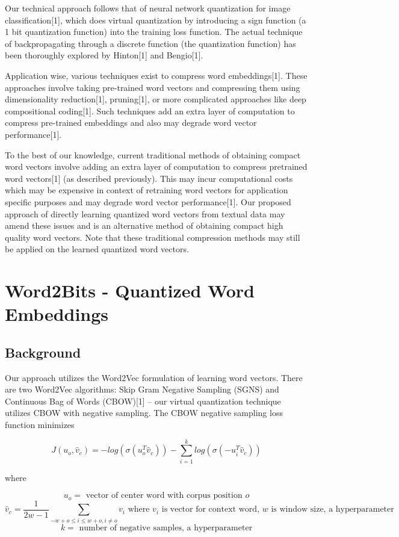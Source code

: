 \documentclass{article} %
\begin{document}
Our technical approach follows that of neural network quantization for
image classification[1], which does virtual quantization by
introducing a sign function (a 1 bit quantization function) into the
training loss function. The actual technique of backpropagating through a
discrete function (the quantization function) has been thoroughly
explored by Hinton[1] and Bengio[1].

Application wise, various techniques exist to compress word
embeddings[1]. These approaches involve taking pre-trained word
vectors and compressing them using dimensionality reduction[1],
pruning[1], or more complicated approaches like deep compositional
coding[1]. Such techniques add an extra layer of computation to
compress pre-trained embeddings and also may degrade word vector
performance[1].

To the best of our knowledge, current traditional methods of obtaining
compact word vectors involve adding an extra layer of computation to
compress pretrained word vectors[1] (as described previously). This
may incur computational costs which may be expensive in context of
retraining word vectors for application specific purposes and may
degrade word vector performance[1]. Our proposed approach of directly
learning quantized word vectors from textual data may amend these
issues and is an alternative method of obtaining compact high quality
word vectors. Note that these traditional compression methods may
still be applied on the learned quantized word vectors.

\section{Word2Bits - Quantized Word Embeddings}
\subsection{Background}
Our approach utilizes the Word2Vec formulation of learning word vectors. There
are two Word2Vec algorithms: Skip Gram Negative Sampling (SGNS) and
Continuous Bag of Words (CBOW)[1] -- our virtual quantization
technique utilizes CBOW with negative sampling. The CBOW negative
sampling loss function minimizes

$$
J(u_o, \hat{v}_c) = -log(\sigma(u_o^T\hat{v}_c)) - \sum_{i=1}^{k} log(\sigma(-u_i^T\hat{v}_c))
$$

where

$$
u_o = \mbox{ vector of center word with corpus position } o
$$
$$
\hat{v}_c = \frac{1}{2w-1}\sum_{-w+o \leq i \leq w+o,i \neq o} v_i \mbox{  where } v_i \mbox{ is vector for context word, } w \mbox{ is window size, a hyperparameter}
$$
$$
k = \mbox{ number of negative samples, a hyperparameter}
$$
\end{document}
